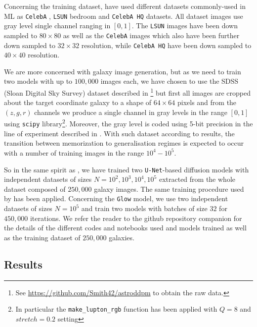 \documentclass[11pt]{amsart}
\begin{document}
Concerning the training dataset, \cite{kadkhodaie2024generalization}  have used different datasets commonly-used in ML as \texttt{CelebA} \citep{Liu2015}, \texttt{LSUN} bedroom \citep{Yu2015} and  \texttt{CelebA HQ} \citep{KarrasALL18} datasets. All dataset images use  gray level single channel ranging in $[0,1]$.  The \texttt{LSUN}  images have been down sampled to $80\times 80$ as well as the \texttt{CelebA} images which also have been further down sampled to $32\times 32$ resolution, while \texttt{CelebA HQ}  have been down sampled to $40\times 40$ resolution.


We are more concerned with galaxy image generation, but as we need to train two models with up to $100,000$ images each, we have chosen to use the SDSS (Sloan Digital Sky Survey) dataset described in \citep{smith2021}\footnote{See \url{https://github.com/Smith42/astroddpm} to obtain the raw data.} but first all images are cropped about the target coordinate galaxy to a shape of $64\times 64$ pixels and from the $(z,g,r)$ channels we produce a single  channel in gray levels in the range $[0,1]$ using \texttt{scipy} \citep{2020SciPy-NMeth} library\footnote{In particular the \texttt{make\_lupton\_rgb} function has been applied with $Q=8$ and $stretch=0.2$ setting}. Moreover, the gray level is coded using 5-bit precision in the line of experiment described in \cite{Kingma2018}. With such dataset according to \cite{kadkhodaie2024generalization} results, the transition between memorization to generalisation regimes is expected to occur with a number of training images in the range $10^4-10^5$. 

So in the same spirit as \citep{kadkhodaie2024generalization}, we have trained two \texttt{U-Net}-based diffusion models with independent datasets of sizes  $N=10^2,10^3,10^4,10^5$ extracted from the whole dataset composed of $250,000$ galaxy images. The same training procedure used by \cite{kadkhodaie2024generalization} has been applied. Concerning the \texttt{Glow} model, we use two independent datasets of sizes $N=10^5$ and train two models with  batches of size $32$ for $450,000$ iterations. {\color{red} We refer the reader to the  github repository companion for the details of the different codes and notebooks used and models trained as well as the training dataset of $250,000$ galaxies.}
%
\subsection{Results}
%
\end{document}

